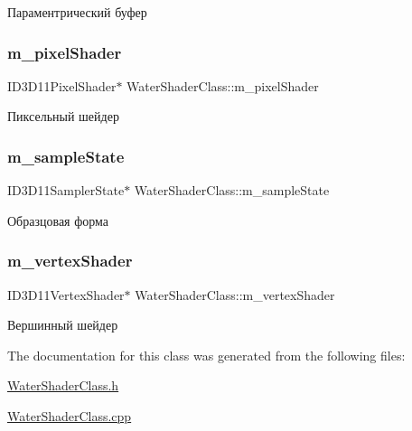 Параментрический буфер 

\mbox{\label{class_water_shader_class_a16c57ccae08dfbb816cc5f5c5e46fe57}} 
\subsubsection{\texorpdfstring{m\+\_\+pixel\+Shader}{m\_pixelShader}}
{\footnotesize\ttfamily I\+D3\+D11\+Pixel\+Shader$\ast$ Water\+Shader\+Class\+::m\+\_\+pixel\+Shader\hspace{0.3cm}{\ttfamily [private]}}



Пиксельный шейдер 

\mbox{\label{class_water_shader_class_a54ef352dae939e2ca34d1925eca1aa34}} 
\subsubsection{\texorpdfstring{m\+\_\+sample\+State}{m\_sampleState}}
{\footnotesize\ttfamily I\+D3\+D11\+Sampler\+State$\ast$ Water\+Shader\+Class\+::m\+\_\+sample\+State\hspace{0.3cm}{\ttfamily [private]}}



Образцовая форма 

\mbox{\label{class_water_shader_class_ae19ada2749dd674be5042363baa12050}} 
\subsubsection{\texorpdfstring{m\+\_\+vertex\+Shader}{m\_vertexShader}}
{\footnotesize\ttfamily I\+D3\+D11\+Vertex\+Shader$\ast$ Water\+Shader\+Class\+::m\+\_\+vertex\+Shader\hspace{0.3cm}{\ttfamily [private]}}



Вершинный шейдер 



The documentation for this class was generated from the following files\+:\begin{DoxyCompactItemize}
\item 
\hyperlink{_water_shader_class_8h}{Water\+Shader\+Class.\+h}\item 
\hyperlink{_water_shader_class_8cpp}{Water\+Shader\+Class.\+cpp}\end{DoxyCompactItemize}
